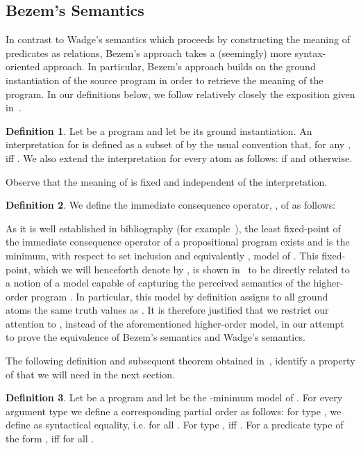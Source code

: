 \documentclass[submission,copyright]{eptcs}
\theoremstyle{definition}
\newtheorem{definition}{Definition}
\begin{document}
\subsection{Bezem's Semantics}
\label{sec:bezemsem}
In contrast to Wadge's semantics which proceeds by constructing the meaning of predicates
as relations, Bezem's approach takes a (seemingly) more syntax-oriented approach. In particular,
Bezem's approach builds on the ground instantiation of the source program in order to
retrieve the meaning of the program. In our definitions below, we follow relatively closely
the exposition given in~\cite{Bezem99,Bezem01,Bezem2002}.
\begin{definition}
Let  be a program and let  be its ground instantiation.
An interpretation  for  is defined as a subset of 
by the usual convention that, for any , 
iff . We also extend the interpretation  for every 
atom as follows:  if  and  otherwise.\end{definition}

Observe that the meaning of  is fixed and independent of the interpretation.

\begin{definition}
We define the immediate consequence operator, , of  as follows:

\end{definition}

As it is well established in bibliography (for example~\cite{lloyd}), the least fixed-point of the immediate consequence operator of a propositional program exists and is the minimum, with respect to
set inclusion and equivalently , model of . This fixed-point, which we will henceforth denote by , is shown in~\cite{Bezem99,Bezem01} to be directly related to a notion of a model capable of capturing the perceived semantics of the higher-order program . In particular, this model by definition assigns to all ground atoms the same truth values as . It is therefore justified that we restrict our attention to , instead of the aforementioned higher-order model, in our attempt to prove the equivalence of Bezem's semantics and Wadge's semantics.



The following definition and subsequent theorem obtained in~\cite{Bezem2002},
identify a property of  that we will need in the next section.
\begin{definition}
Let  be a program and let  be the -minimum model of .
For every argument type  we define a corresponding partial order as follows: for type , we define
 as syntactical equality, i.e.  for all .
For type ,  iff . For a predicate type of
the form ,  iff
 for all .
\end{definition}
\end{document}
